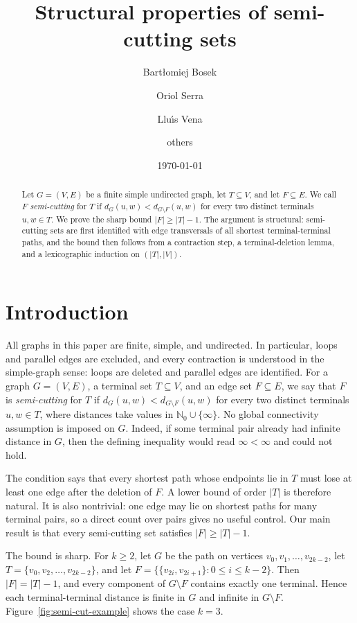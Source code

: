 \documentclass[11pt,a4paper]{amsart}
\title{Structural properties of semi-cutting sets}
\author{Bart{\l}omiej Bosek}
\author{Oriol Serra}
\author{Llu{\'{\i}}s Vena}
\author{others}
\date{\today}
\theoremstyle{definition}
\theoremstyle{plain}
\newcommand{\dist}[3]{d_{#1}(#2,#3)}
\begin{document}
\begin{abstract}
Let $G=(V,E)$ be a finite simple undirected graph, let $T\subseteq V$, and let $F\subseteq E$. We call $F$ \emph{semi-cutting} for $T$ if $\dist{G}{u}{w}<\dist{G\setminus F}{u}{w}$ for every two distinct terminals $u,w\in T$. We prove the sharp bound $|F|\ge |T|-1$. The argument is structural: semi-cutting sets are first identified with edge transversals of all shortest terminal-terminal paths, and the bound then follows from a contraction step, a terminal-deletion lemma, and a lexicographic induction on $(|T|,|V|)$.
\end{abstract}

\maketitle

\section{Introduction}

All graphs in this paper are finite, simple, and undirected. In particular, loops and parallel edges are excluded, and every contraction is understood in the simple-graph sense: loops are deleted and parallel edges are identified. For a graph $G=(V,E)$, a terminal set $T\subseteq V$, and an edge set $F\subseteq E$, we say that $F$ is \emph{semi-cutting} for $T$ if $\dist{G}{u}{w}<\dist{G\setminus F}{u}{w}$ for every two distinct terminals $u,w\in T$, where distances take values in $\mathbb{N}_0\cup\{\infty\}$. No global connectivity assumption is imposed on $G$. Indeed, if some terminal pair already had infinite distance in $G$, then the defining inequality would read $\infty<\infty$ and could not hold.

The condition says that every shortest path whose endpoints lie in $T$ must lose at least one edge after the deletion of $F$. A lower bound of order $|T|$ is therefore natural. It is also nontrivial: one edge may lie on shortest paths for many terminal pairs, so a direct count over pairs gives no useful control. Our main result is that every semi-cutting set satisfies $|F|\ge |T|-1$.

The bound is sharp. For $k\ge 2$, let $G$ be the path on vertices $v_0,v_1,\dots,v_{2k-2}$, let $T=\{v_0,v_2,\dots,v_{2k-2}\}$, and let $F=\bigl\{\{v_{2i},v_{2i+1}\}: 0\le i\le k-2\bigr\}$. Then $|F|=|T|-1$, and every component of $G\setminus F$ contains exactly one terminal. Hence each terminal-terminal distance is finite in $G$ and infinite in $G\setminus F$. Figure~\ref{fig:semi-cut-example} shows the case $k=3$.
\end{document}
